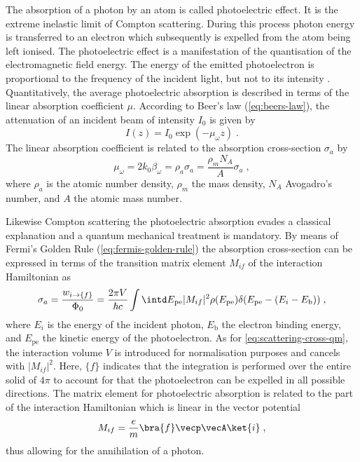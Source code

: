 \documentclass[
twoside,
openright,
titlepage,
numbers=noenddot,
headinclude,
fleqn,
a4paper,
footinclude=true,
cleardoublepage=empty,
abstractoff,
BCOR=5mm,
paper=a4,
fontsize=11pt,
british,ngerman,american,
]{scrreprt}
\begin{document}
The absorption of a photon by an atom is called photoelectric effect.
It is the extreme inelastic limit of Compton scattering.  During this
process photon energy is transferred to an electron which subsequently
is expelled from the atom being left ionised.  The photoelectric
effect is a manifestation of the quantisation of the electromagnetic
field energy.  The energy of the emitted photoelectron is proportional
to the frequency of the incident light, but not to its intensity
\cite{Einstein1905}.  Quantitatively, the average photoelectric
absorption is described in terms of the linear absorption coefficient
$\mu$.  According to Beer's law (\cref{eq:beers-law}), the attenuation
of an incident beam of intensity $I_0$ is given by
\begin{equation}
  \label{eq:beers-law-2}
  I(z) = I_0\exp(-\mu_\omega z)\;.
\end{equation}
The linear absorption coefficient is related to the absorption
cross-section $\sigma_a$ by
\begin{equation}
  \label{eq:absorption-cross}
  \mu_\omega=2k_0\beta_\omega = \rho_a\sigma_a 
  = \frac{\rho_m N_A}{A}\sigma_a\;,
\end{equation}
where $\rho_a$ is the atomic number density, $\rho_m$ the mass
density, $N_A$ Avogadro's number, and $A$ the atomic mass number.

Likewise Compton scattering the photoelectric absorption evades a
classical explanation and a quantum mechanical treatment is mandatory.
By means of Fermi's Golden Rule (\cref{eq:fermis-golden-rule}) the
absorption cross-section can be expressed in terms of the transition
matrix element $M_{if}$ of the interaction Hamiltonian as
\begin{equation}
  \label{eq:absorption-cross-qm}
  \sigma_a=\frac{w_{i\to\{f\}}}{\Phi_0} = 
  \frac{2\pi V}{\hbar c}\int\intd E_{\mathrm{pe}}|M_{if}|^2
  \rho(E_{\mathrm{pe}})\delta(E_{\mathrm{pe}}-(E_i-E_{\mathrm{b}}))\;,
\end{equation}
where $E_i$ is the energy of the incident photon, $E_{\mathrm{b}}$ the
electron binding energy, and $E_{\mathrm{pe}}$ the kinetic energy of
the photoelectron.  As for \cref{eq:scattering-cross-qm}, the
interaction volume $V$ is introduced for normalisation purposes and
cancels with $|M_{if}|^2$.  Here, $\{f\}$ indicates that the
integration is performed over the entire solid of $4\pi$ to account
for that the photoelectron can be expelled in all possible directions.
The matrix element for photoelectric absorption is related to the part
of the interaction Hamiltonian which is linear in the vector potential
\begin{equation}
  M_{if}=\frac{e}{m}\bra{f}\vecp\vecA\ket{i} \;,
\end{equation}
thus allowing for the annihilation of a photon.
\end{document}
